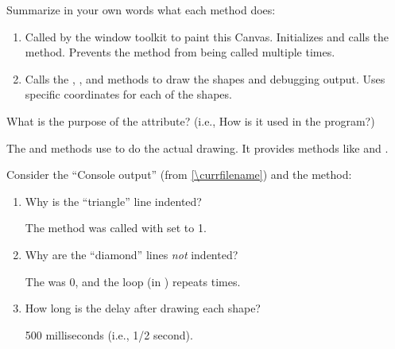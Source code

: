 \Q Summarize in your own words what each method does:

\begin{enumerate}

\item {}

\begin{answer}[2em]
Called by the window toolkit to paint this Canvas.
Initializes  and calls the  method.
Prevents the  method from being called multiple times.
\end{answer}

\item {}

\begin{answer}[2em]
Calls the , , and  methods to draw the shapes and debugging output.
Uses specific coordinates for each of the shapes.
\end{answer}

\end{enumerate}


\Q What is the purpose of the  attribute? (i.e., How is it used in the program?)

\begin{answer}[3em]
The  and  methods use  to do the actual drawing.
It provides methods like  and .
\end{answer}


\Q Consider the ``Console output'' (from \ref{\currfilename}) and the  method:

\begin{enumerate}

\item Why is the ``triangle'' line indented?

\begin{answer}[2em]
The  method was called with  set to 1.
\end{answer}

\item Why are the ``diamond'' lines \emph{not} indented?

\begin{answer}[2em]
The  was 0, and the loop (in ) repeats  times.
\end{answer}

\item How long is the delay after drawing each shape?

\begin{answer}[2em]
500 milliseconds (i.e., 1/2 second).
\end{answer}

\end{enumerate}


